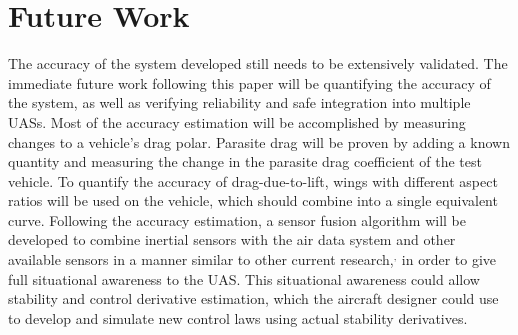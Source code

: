 \section{Future Work}
The accuracy of the system developed still needs to be extensively validated. The immediate future work following this paper will be quantifying the accuracy of the system, as well as verifying reliability and safe integration into multiple UASs. Most of the accuracy estimation will be accomplished by measuring changes to a vehicle's drag polar. Parasite drag will be proven by adding a known quantity and measuring the change in the parasite drag coefficient of the test vehicle. To quantify the accuracy of drag-due-to-lift, wings with different aspect ratios will be used on the vehicle, which should combine into a single equivalent curve\cite{prandtl1923applications}. Following the accuracy estimation, a sensor fusion algorithm will be developed to combine inertial sensors with the air data system and other available sensors in a manner similar to other current research,\cite{wvINSAirData}$^,$\cite{gtUKF} in order to give full situational awareness to the UAS. This situational awareness could allow stability and control derivative estimation, which the aircraft designer could use to develop and simulate new control laws using actual stability derivatives.